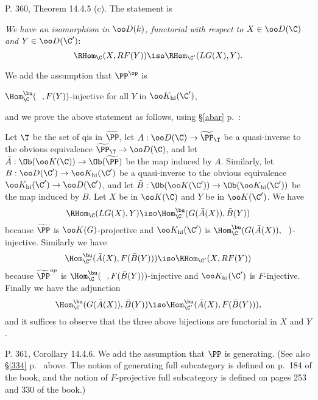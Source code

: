 \documentclass[12pt]{article}
\theoremstyle{remark}
\theoremstyle{definition}
\begin{document}
\begin{s}%
P. 360, Theorem 14.4.5 (c). The statement is 

\nn\emph{We have an isomorphism in $\oo D(k)$, functorial with respect to $X\in\oo D(\C)$ and $Y\in\oo D(\C')$}:
$$
\RHom_\C(X,RF(Y))\iso\RHom_{\C'}(LG(X),Y).
$$ 

We add the assumption that $\PP^{\op}$ is\bigskip

\centerline{$\Hom_\C^\bu(\ \ ,F(Y))$-injective for all $Y$ in $\oo K_{\text{hi}}(\C')$,}\bigskip

and we prove the above statement as follows, using \S\ref{abar} p.~:

Let $\T$ be the set of qis in $\widetilde\PP$, let $A:\oo D(\C)\to\widetilde\PP_\T$ be a quasi-inverse to the obvious equivalence $\widetilde\PP_\T\to\oo D(\C)$, and let $\bar A:\Ob(\oo K(\C))\to\Ob(\widetilde\PP)$ be the map induced by $A$. Similarly, let $B:\oo D(\C')\to\oo K_{\text{hi}}(\C')$ be a quasi-inverse to the obvious equivalence $\oo K_{\text{hi}}(\C')\to\oo D(\C')$, and let $\bar B:\Ob(\oo K(\C'))\to\Ob(\oo K_{\text{hi}}(\C'))$ be the map induced by $B$. Let $X$ be in $\oo K(\C)$ and $Y$ be in $\oo K(\C')$. We have 
$$
\RHom_\C(LG(X),Y)\iso\Hom_\C^\bu(G(\bar A(X)),\bar B(Y))
$$ 
because $\widetilde\PP$ is $\oo K(G)$-projective and $\oo K_{\text{hi}}(\C')$ is $\Hom_\C^\bu(G(\bar A(X)),\ \ )$-injective. Similarly we have 
$$
\Hom_{\C'}^\bu(\bar A(X),F(\bar B(Y)))\iso\RHom_{\C'}(X,RF(Y))
$$ 
because $\widetilde\PP^{op}$ is $\Hom_\C^\bu(\ \ ,F(\bar B(Y)))$-injective and $\oo K_{\text{hi}}(\C')$ is $F$-injective. Finally we have the adjunction 
$$
\Hom_\C^\bu(G(\bar A(X)),\bar B(Y))\iso\Hom_{\C'}^\bu(\bar A(X),F(\bar B(Y))),
$$ 
and it suffices to observe that the three above bijections are functorial in $X$ and $Y$.%
\end{s}

%

\begin{s}
P. 361, Corollary 14.4.6. We add the assumption that $\PP$ is generating. %
(See also \S\ref{334} p.~ above. The notion of generating full subcategory is defined on p.~184 of the book, and the notion of $F$-projective full subcategory is defined on pages 253 and 330 of the book.)
\end{s}
\end{document}
